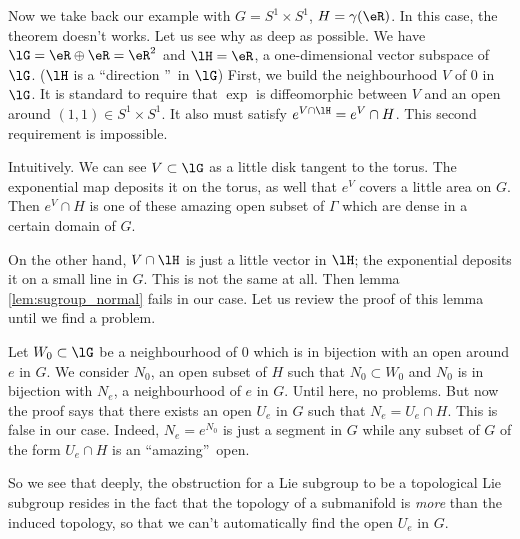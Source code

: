 Now we take back our example with $G=S^1\times S^1$, $H=\gamma(\eR)$. In this case, the theorem doesn't works. Let us see why as deep as possible. We have $\lG=\eR\oplus\eR=\eR^2$ and $\lH=\eR$, a one-dimensional vector subspace of $\lG$. ($\lH$ is a ``direction ''\ in $\lG$) First, we build the neighbourhood $V$ of $0$ in $\lG$. It is standard to require that $\exp$ is diffeomorphic between $V$ and an open around $(1,1)\in S^1\times S^1$. It also must satisfy $e^{V\cap\lH}=e^V\cap H$. This second requirement is impossible.

Intuitively. We can see $V\subset\lG$ as a little disk tangent to  the torus. The exponential map deposits it on the torus, as well that $e^V$ covers a little area on $G$. Then $e^V\cap H$ is one of these amazing open subset of $\Gamma$ which are dense in a certain domain of $G$.

On the other hand, $V\cap\lH$ is just a little vector in $\lH$; the exponential deposits it on a small line in $G$. This is not the same at all. Then lemma \ref{lem:sugroup_normal} fails in our case. Let us review the proof of this lemma until we find a problem. 

Let $W_0\subset\lG$  be a neighbourhood of $0$ which is in bijection with an open around $e$ in $G$. We consider $N_0$, an open subset of $H$ such that $N_0\subset W_0$ and $N_0$ is in bijection with $N_e$, a neighbourhood of $e$ in $G$. Until here, no problems. But now the proof says that there exists an open $U_e$ in $G$ such that $N_e=U_e\cap H$. This is false in our case. Indeed, $N_e=e^{N_0}$ is just a segment in $G$ while any subset of $G$ of the form $U_e\cap H$ is an ``amazing''\ open.

So we see that deeply, the obstruction for a Lie subgroup to be a topological Lie subgroup resides in the fact that the topology of a submanifold is \emph{more} than the induced topology, so that we can't automatically find the open $U_e$ in $G$.
